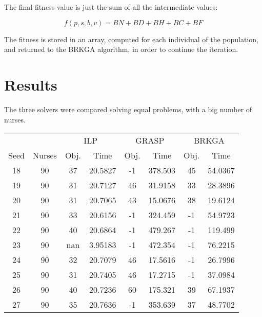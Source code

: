 \documentclass[12pt,a4paper]{article}
\begin{document}
The final fitness value is just the sum of all the intermediate values:

$$ f(p,s,b,v) = BN + BD + BH + BC + BF $$

The fitness is stored in an array, computed for each individual of the
population, and returned to the BRKGA algorithm, in order to continue the
iteration.

\section{Results}

The three solvers were compared solving equal problems, with a big number of
nurses.

\begin{table}[h]
\centering
\begin{tabular}{cccccccc}
\toprule
       &          &\multicolumn{2}{c}{ILP} & \multicolumn{2}{c}{GRASP} & \multicolumn{2}{c}{BRKGA} \\
Seed   &  Nurses  & Obj. & Time & Obj. & Time & Obj. & Time \\
\midrule
    18 &     90   &     37   & 20.5827    &       -1  &  378.503   &        45  &   54.0367 \\
    19 &     90   &     31   & 20.7127    &       46  &   31.9158  &        33  &   28.3896 \\
    20 &     90   &     31   & 20.7065    &       43  &   15.0676  &        38  &   19.6124 \\
    21 &     90   &     33   & 20.6156    &       -1  &  324.459   &        -1  &   54.9723 \\
    22 &     90   &     40   & 20.6864    &       -1  &  479.267   &        -1  &   119.499 \\
    23 &     90   &    nan   & 3.95183    &      -1   &  472.354   &        -1  &   76.2215 \\
    24 &     90   &     32   & 20.7079    &       46  &  17.5616   &       -1   &   26.7996 \\
    25 &     90   &     31   & 20.7405    &       46  &  17.2715   &       -1   &   37.0984 \\
    26 &     90   &     40   & 20.7236    &       60  & 175.321    &       39   &   67.1937 \\
    27 &     90   &     35   & 20.7636    &       -1  & 353.639    &       37   &   48.7702 \\
\bottomrule
\end{tabular}
\end{table}
\end{document}
